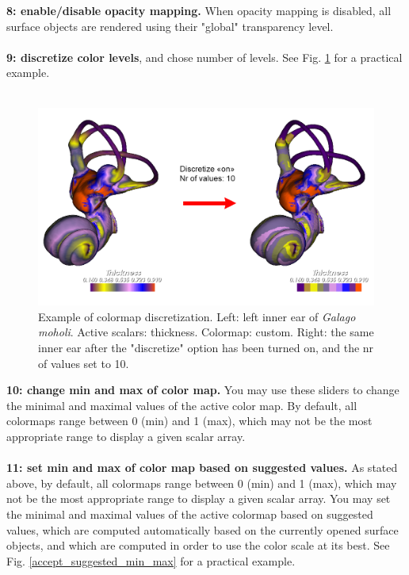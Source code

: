 \noindent
\textbf{8: enable/disable opacity mapping.} When opacity mapping is disabled, all surface objects are rendered using their "global" transparency level.\\\\

\noindent
\textbf{9: discretize color levels}, and chose number of levels. See Fig. \ref{discretize_example} for a practical example.\\\\
\begin{figure}
  \centering
  \includegraphics[scale=0.38]{images/11/discretize_on.png} 
	\caption{
Example of colormap discretization.  Left: left inner ear of \textit{Galago moholi}. Active scalars: thickness. Colormap: custom. Right: the same inner ear after the "discretize" option has been turned on, and the nr of values set to 10.}
\label{discretize_example}
 
\end{figure}

\noindent
\textbf{10: change min and max of color map.} You may use these sliders to change the minimal and maximal values of the active color map. By default, all colormaps range between 0 (min) and 1 (max), which may not be the most appropriate range to display a given scalar array. \\\\ 


\noindent
\textbf{11: set min and max of color map based on suggested values.} As stated above, by default, all colormaps range between 0 (min) and 1 (max), which may not be the most appropriate range to display a given scalar array. You may set the minimal and maximal values of the active colormap based on suggested values, which are computed automatically based on the currently opened surface objects, and which are computed in order to use the color scale at its best. See Fig. \ref{accept_suggested_min_max} for a practical example. \\\\

